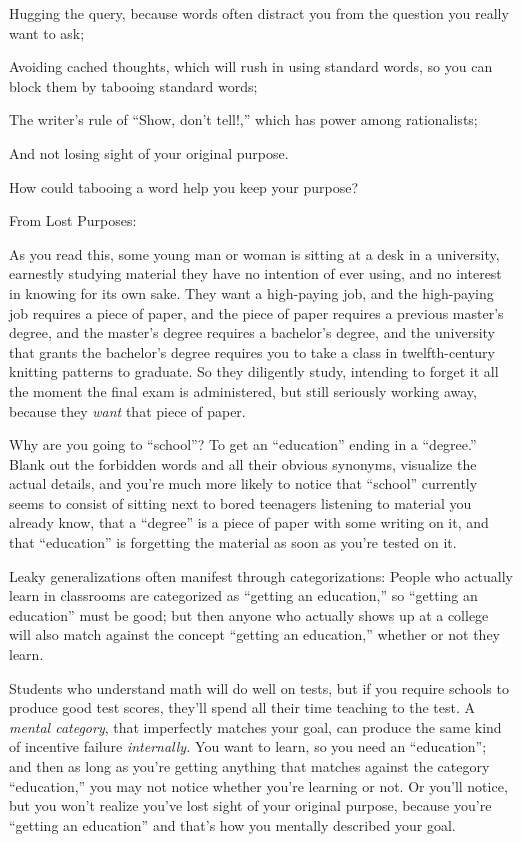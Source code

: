 {
 Hugging the query, because words often distract you from the
question you really want to ask;}

{
 Avoiding cached thoughts, which will rush in using standard words,
so you can block them by tabooing standard words;}

{
 The writer's rule of ``Show,
don't tell!,'' which has power among
rationalists;}

{
 And not losing sight of your original purpose.}

{
 How could tabooing a word help you keep your purpose?}

{
 From Lost Purposes:}

{
 As you read this, some young man or woman is sitting at a desk in
a university, earnestly studying material they have no intention of
ever using, and no interest in knowing for its own sake. They want a
high-paying job, and the high-paying job requires a piece of paper, and
the piece of paper requires a previous master's degree,
and the master's degree requires a
bachelor's degree, and the university that grants the
bachelor's degree requires you to take a class in
twelfth-century knitting patterns to graduate. So they diligently
study, intending to forget it all the moment the final exam is
administered, but still seriously working away, because they
\textit{want} that piece of paper.}

{
 Why are you going to
``school''? To get an
``education'' ending in a
``degree.'' Blank out the forbidden
words and all their obvious synonyms, visualize the actual details, and
you're much more likely to notice that
``school'' currently seems to
consist of sitting next to bored teenagers listening to material you
already know, that a ``degree'' is a
piece of paper with some writing on it, and that
``education'' is forgetting the
material as soon as you're tested on it.}

{
 Leaky generalizations often manifest through categorizations:
People who actually learn in classrooms are categorized as
``getting an education,'' so
``getting an education'' must be
good; but then anyone who actually shows up at a college will also
match against the concept ``getting an
education,'' whether or not they learn.}

{
 Students who understand math will do well on tests, but if you
require schools to produce good test scores, they'll
spend all their time teaching to the test. A \textit{mental category},
that imperfectly matches your goal, can produce the same kind of
incentive failure \textit{internally.} You want to learn, so you need
an ``education''; and then as long
as you're getting anything that matches against the
category ``education,'' you may not
notice whether you're learning or not. Or
you'll notice, but you won't realize
you've lost sight of your original purpose, because
you're ``getting an
education'' and that's how you
mentally described your goal.}

